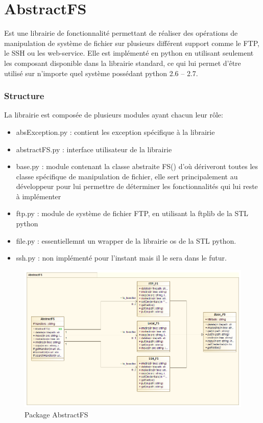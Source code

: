 \part*{AbstractFS}
Est une librairie de fonctionnalité  permettant de réaliser des opérations de manipulation de système de fichier sur plusieurs différent support comme le FTP, le SSH ou les web-service.
Elle est implémenté en python en utilisant seulement les composant disponible dans la librairie standard, ce qui lui permet d'être utilisé sur n'importe quel système possédant python 2.6 – 2.7.
\section*{Structure}
La librairie est composée de plusieurs modules ayant chacun leur rôle:

\begin{itemize}
\item absException.py : contient les exception spécifique à la librairie
\item abstractFS.py : interface utilisateur de la librairie
\item base.py : module contenant la classe abstraite FS() d'où dériveront toutes les classe spécifique de manipulation de fichier, elle sert principalement au développeur pour lui permettre de déterminer les fonctionnalités qui lui reste à implémenter
\item ftp.py : module de système de fichier FTP, en utilisant la ftplib de la STL python
\item file.py : essentiellemnt un wrapper de la librairie os de la STL python.
\item ssh.py : non implémenté pour l'instant mais il le sera dans le futur.
\end{itemize}

\begin{figure}[h!]
	\centering
	\includegraphics[scale=0.35]{images/package_abstract_fs.png}
	\caption{Package AbstractFS}
\end{figure}

